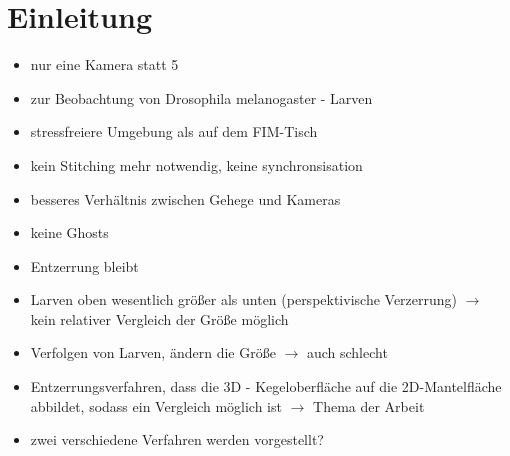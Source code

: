 \chapter{Einleitung}
\begin{itemize}
	\item nur eine Kamera statt 5
	\item zur Beobachtung von Drosophila melanogaster - Larven
	\item stressfreiere Umgebung als auf dem FIM-Tisch
	\item kein Stitching mehr notwendig, keine synchronsisation
	\item besseres Verhältnis zwischen Gehege und Kameras
	\item keine Ghosts
	\item Entzerrung bleibt
	\item Larven oben wesentlich größer als unten (perspektivische Verzerrung) $\rightarrow$ kein relativer Vergleich der Größe möglich
	\item Verfolgen von Larven, ändern die Größe $\rightarrow$ auch schlecht
	\item Entzerrungsverfahren, dass die 3D - Kegeloberfläche auf die 2D-Mantelfläche abbildet, sodass ein Vergleich möglich ist $\rightarrow$ Thema der Arbeit
	\item zwei verschiedene Verfahren werden vorgestellt?
\end{itemize}

